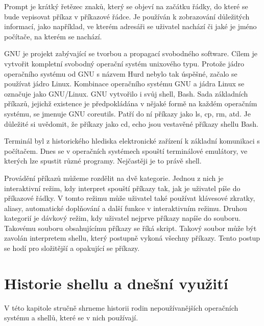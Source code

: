 \documentclass[thesis=M,czech]{FITthesis}[2012/06/26]
\begin{document}
Prompt je krátký řetězec znaků, který se objeví na začátku řádky, do které se bude vepisovat příkaz v příkazové řádce. Je používán k zobrazování důležitých informací, jako například, ve kterém adresáři se uživatel nachází či jaké je jméno počítače, na kterém se nachází.


GNU je projekt zabývající se tvorbou a propagací svobodného software. Cílem je vytvořit kompletní svobodný operační systém unixového typu. Protože jádro operačního systému od GNU s názvem Hurd nebylo tak úspěšné, začalo se používat jádro Linux. Kombinace operačního systému GNU a jádra Linux se označuje jako GNU/Linux. GNU vytvořilo i svůj shell, Bash. Sada základních příkazů, jejichž existence je předpokládána v nějaké formě na každém operačním systému, se jmenuje GNU coreutils. Patří do ní příkazy jako ls, cp, rm, atd. Je důležité si uvědomit, že příkazy jako cd, echo jsou vestavěné příkazy shellu Bash.


Terminál byl z historického hlediska elektronické zařízení k základní komunikaci s počítačem. Dnes se v operačních systémech spouští terminálové emulátory, ve kterých lze spustit různé programy. Nejčastěji je to právě shell.


Provádění příkazů můžeme rozdělit na dvě kategorie. Jednou z nich je interaktivní režim, kdy interpret spouští příkazy tak, jak je uživatel píše do příkazové řádky. V tomto režimu může uživatel také používat klávesové zkratky, aliasy, automatické doplňování a další funkce v interaktivním režimu. Druhou kategorií je dávkový režim, kdy uživatel nejprve příkazy napíše do souboru. Takovému souboru obsahujícímu příkazy se říká skript. Takový soubor může být zavolán interpretem shellu, který postupně vykoná všechny příkazy. Tento postup se hodí pro složitější a opakující se příkazy.

\chapter{Historie shellu a dnešní využití}

V této kapitole stručně shrneme historii rodin nepoužívanějších operačních systému a shellů, které se v nich používají. 

\end{document}
